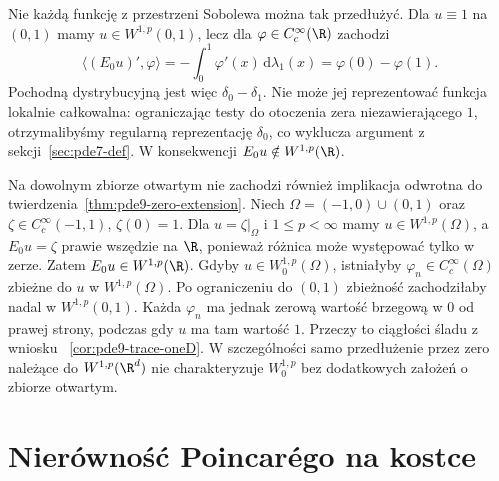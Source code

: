 \begin{uwaga}
Nie każdą funkcję z przestrzeni Sobolewa można tak przedłużyć.
Dla $u\equiv1$ na $(0,1)$ mamy $u\in W^{1,p}(0,1)$,
lecz dla $\varphi\in C_c^\infty(\R)$ zachodzi
\[
 \langle (E_0u)',\varphi\rangle
 =-\int_0^1\varphi'(x)\,\mathrm d\lambda_1(x)
 =\varphi(0)-\varphi(1).
\]
Pochodną dystrybucyjną jest więc $\delta_0-\delta_1$.
Nie może jej reprezentować funkcja lokalnie całkowalna:
ograniczając testy do otoczenia zera niezawierającego $1$,
otrzymalibyśmy regularną reprezentację $\delta_0$,
co wyklucza argument z sekcji~\ref{sec:pde7-def}.
W konsekwencji $E_0u\notin W^{1,p}(\R)$.

Na dowolnym zbiorze otwartym nie zachodzi również
implikacja odwrotna do twierdzenia~\ref{thm:pde9-zero-extension}.
Niech $\Omega=(-1,0)\cup(0,1)$ oraz
$\zeta\in C_c^\infty(-1,1)$, $\zeta(0)=1$.
Dla $u=\zeta|_\Omega$ i $1\le p<\infty$ mamy
$u\in W^{1,p}(\Omega)$, a $E_0u=\zeta$ prawie wszędzie
na $\R$, ponieważ różnica może występować tylko w zerze.
Zatem $E_0u\in W^{1,p}(\R)$.
Gdyby $u\in W^{1,p}_0(\Omega)$, istniałyby
$\varphi_n\in C_c^\infty(\Omega)$ zbieżne do $u$
w $W^{1,p}(\Omega)$. Po ograniczeniu do $(0,1)$
zbieżność zachodziłaby nadal w $W^{1,p}(0,1)$.
Każda $\varphi_n$ ma jednak zerową wartość brzegową
w $0$ od prawej strony, podczas gdy $u$ ma tam wartość $1$.
Przeczy to ciągłości śladu z wniosku
~\ref{cor:pde9-trace-oneD}.
W szczególności samo przedłużenie przez zero należące
do $W^{1,p}(\R^d)$ nie charakteryzuje $W^{1,p}_0$
bez dodatkowych założeń o zbiorze otwartym.
\end{uwaga}


\section{Nierówność Poincarégo na kostce}
\label{sec:pde9-poincare}

